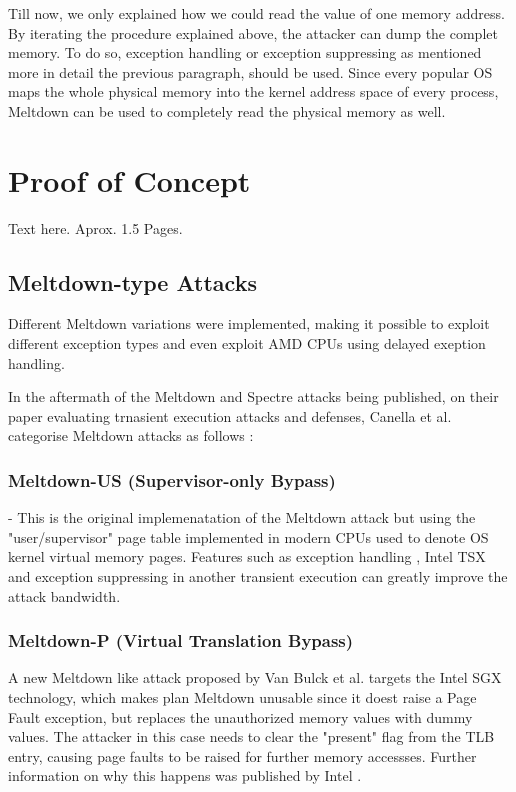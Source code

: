 \documentclass[sigconf]{acmart}
\begin{document}
Till now, we only explained how we could read the value of one memory address. By iterating the procedure explained above, the attacker can dump the complet memory. To do so, exception handling or exception suppressing as mentioned more in detail the previous paragraph, should be used. 
Since every popular OS maps the whole physical memory into the kernel address space of every process, Meltdown can be used to completely read the physical memory as well. 


\section{Proof of Concept}

Text here. Aprox. 1.5 Pages.

\subsection{Meltdown-type Attacks}
Different Meltdown variations were implemented, making it possible to exploit different exception types and even exploit AMD CPUs using delayed exeption handling. 

In the aftermath of the Meltdown and Spectre attacks being published, on their paper evaluating trnasient execution attacks and defenses, Canella et al. \cite{Canella2018ASE} categorise Meltdown attacks as follows :

\subsubsection{Meltdown-US (Supervisor-only Bypass)}
 - This is the original implemenatation of the Meltdown attack but using the "user/supervisor" page table implemented in modern CPUs used to denote OS kernel virtual memory pages. 
 Features such as exception handling \cite{}, Intel TSX \cite{} and exception suppressing in another transient execution \cite{} can greatly improve the attack bandwidth. 

\subsubsection{Meltdown-P (Virtual Translation Bypass)}

A new Meltdown like attack proposed by Van Bulck et al. \cite{} targets the Intel SGX \cite{} technology, which makes plan Meltdown unusable since it doest raise a Page Fault exception, but replaces the unauthorized memory values with dummy values. The attacker in this case needs to clear the "present" flag from the TLB entry, causing page faults to be raised for further memory accessses. Further information on why this happens was published by Intel \cite{} .
\end{document}
